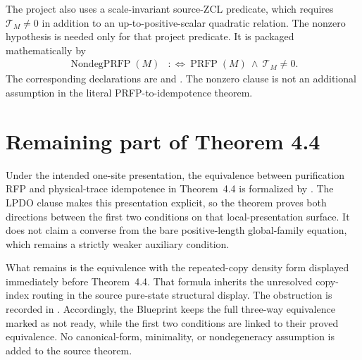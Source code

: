 \documentclass{article}
\begin{document}
The project also uses a scale-invariant source-ZCL predicate, which requires
$\mathcal T_M\ne0$ in addition to an up-to-positive-scalar quadratic relation.
The nonzero hypothesis is needed only for that project predicate. It is packaged
mathematically by
\begin{align}
    \operatorname{NondegPRFP}(M)
        &:\Longleftrightarrow
        \operatorname{PRFP}(M)\ \wedge\ \mathcal T_M\ne0.
    \label{eq:cpsv16_prfp_nondegenerate_definition}
\end{align}
The corresponding declarations are  and
. The nonzero clause is not an additional
assumption in the literal PRFP-to-idempotence theorem.

\section{Remaining part of Theorem 4.4}

Under the intended one-site presentation, the equivalence between purification
RFP and physical-trace idempotence in Theorem~4.4
\cite[lines~777--784]{Cirac2016MPDO_arXiv} is formalized by
. The LPDO clause
makes this presentation explicit, so the theorem proves both directions between
the first two conditions on that local-presentation surface. It does not claim a
converse from the bare positive-length global-family equation, which remains a
strictly weaker auxiliary condition.

What remains is the equivalence with the repeated-copy density form displayed
immediately before Theorem~4.4. That formula inherits the unresolved
copy-index routing in the source pure-state structural display. The obstruction
is recorded in .
Accordingly, the Blueprint keeps the full three-way equivalence marked as not
ready, while the first two conditions are linked to their proved equivalence.
No canonical-form, minimality, or nondegeneracy assumption is added to the
source theorem.



\end{document}

